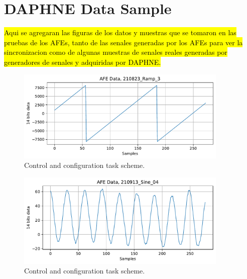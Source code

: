 \section{DAPHNE Data Sample}

\hl{Aqui se agregaran las figuras de los datos y muestras que se tomaron en las pruebas de los AFEs, tanto de las senales generadas por los AFEs para ver la sincronizacion como de algunas muestras de senales reales generadas por generadores de senales y adquiridas por DAPHNE.}

\begin{figure}[htbp]
\centering %
\includegraphics[width=0.9\textwidth,origin=c,angle=0]{Images/DaphneAFETest/210823_Ramp_3.pdf}
\caption{\label{fig:InitPeriTask} Control and configuration task scheme.}
\end{figure}


\begin{figure}[htbp]
\centering %
\includegraphics[width=0.9\textwidth,origin=c,angle=0]{Images/DaphneAFETest/210913_Sine_04.pdf}
\caption{\label{fig:InitPeriTask} Control and configuration task scheme.}
\end{figure}


